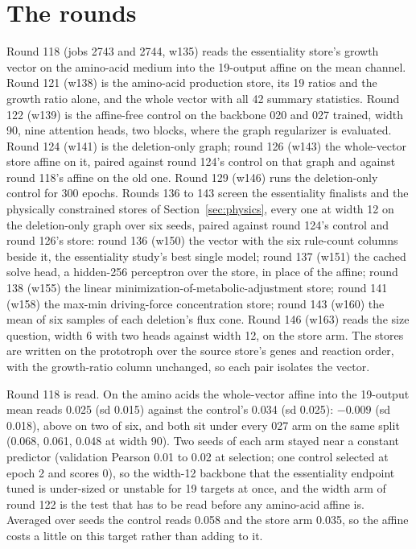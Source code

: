 \section{The rounds}
\label{sec:rounds}

Round 118 (jobs 2743 and 2744, w135) reads the essentiality store's growth vector on
the amino-acid medium into the 19-output affine on the mean channel. Round 121 (w138) is
the amino-acid production store, its 19 ratios and the growth ratio alone, and the whole
vector with all 42 summary statistics. Round 122 (w139) is the affine-free control on
the backbone 020 and 027 trained, width 90, nine attention heads, two blocks, where the
graph regularizer is evaluated. Round 124 (w141) is the deletion-only graph; round 126
(w143) the whole-vector store affine on it, paired against round 124's control on that
graph and against round 118's affine on the old one. Round 129 (w146) runs the
deletion-only control for 300 epochs. Rounds 136 to 143 screen the essentiality
finalists and the physically constrained stores of Section~\ref{sec:physics}, every one
at width 12 on the deletion-only graph over six seeds, paired against round 124's
control and round 126's store: round 136 (w150) the vector with the six rule-count
columns beside it, the essentiality study's best single model; round 137 (w151) the
cached solve head, a hidden-256 perceptron over the store, in place of the affine;
round 138 (w155) the linear minimization-of-metabolic-adjustment store; round 141 (w158)
the max-min driving-force concentration store; round 143 (w160) the mean of six samples
of each deletion's flux cone. Round 146 (w163) reads the size question, width 6 with two
heads against width 12, on the store arm. The stores are written on the prototroph over
the source store's genes and reaction order, with the growth-ratio column unchanged, so
each pair isolates the vector.

Round 118 is read. On the amino acids the whole-vector affine into the 19-output mean
reads 0.025 (sd 0.015) against the control's 0.034 (sd 0.025): $-0.009$ (sd 0.018),
above on two of six, and both sit under every 027 arm on the same split (0.068, 0.061,
0.048 at width 90). Two seeds of each arm stayed near a constant predictor (validation
Pearson 0.01 to 0.02 at selection; one control selected at epoch 2 and scores 0), so the
width-12 backbone that the essentiality endpoint tuned is under-sized or unstable for
19 targets at once, and the width arm of round 122 is the test that has to be read
before any amino-acid affine is. Averaged over seeds the control reads 0.058 and the
store arm 0.035, so the affine costs a little on this target rather than adding to it.

